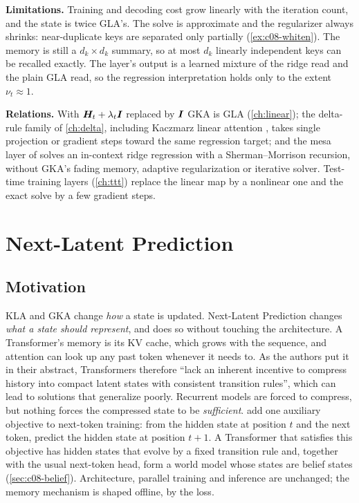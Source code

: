 \textbf{Limitations.} Training and decoding cost grow linearly with the iteration count, and the
state is twice GLA's. The solve is approximate and the regularizer always shrinks: near-duplicate
keys are separated only partially (\cref{ex:c08-whiten}). The memory is still a $d_k\times d_k$
summary, so at most $d_k$ linearly independent keys can be recalled exactly. The layer's output is
a learned mixture of the ridge read and the plain GLA read, so the regression interpretation holds
only to the extent $\nu_t\approx1$.

\textbf{Relations.} With $\bm{H}_t+\lambda_t\bm{I}$ replaced by $\bm{I}$ GKA is GLA (\cref{ch:linear}); the
delta-rule family of \cref{ch:delta}, including Kaczmarz linear attention \citep{zou2026kaczmarz},
takes single projection or gradient steps toward the same regression target; and the mesa layer of
\citet{c08-vonoswald2023mesa} solves an in-context ridge regression with a Sherman--Morrison
recursion, without GKA's fading memory, adaptive regularization or iterative solver. Test-time
training layers (\cref{ch:ttt}) replace the linear map by a nonlinear one and the exact solve by
a few gradient steps.

\section{Next-Latent Prediction}\label{sec:c08-nextlat}

\subsection{Motivation}

KLA and GKA change \emph{how} a state is updated. Next-Latent Prediction changes \emph{what a state
should represent}, and does so without touching the architecture. A Transformer's memory is its KV
cache, which grows with the sequence, and attention can look up any past token whenever it needs
to. As the authors put it in their abstract, Transformers therefore ``lack an inherent incentive to
compress history into compact latent states with consistent transition rules'', which can lead to
solutions that generalize poorly. Recurrent models are forced to compress, but nothing forces the
compressed state to be \emph{sufficient}.  add one auxiliary objective to
next-token training: from the hidden state at position $t$ and the next token, predict the hidden
state at position $t+1$. A Transformer that satisfies this objective has hidden states that evolve
by a fixed transition rule and, together with the usual next-token head, form a world model whose
states are belief states (\cref{sec:c08-belief}). Architecture, parallel training and inference are
unchanged; the memory mechanism is shaped offline, by the loss.

